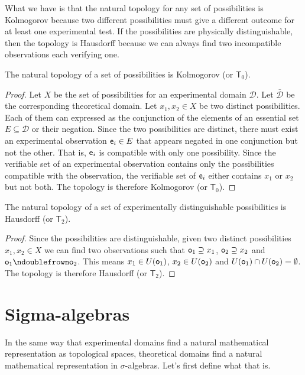 \documentclass[11pt,letterpaper,fleqn]{memoir} %
\begin{document}
What we have is that the natural topology for any set of possibilities is Kolmogorov because two different possibilities must give a different outcome for at least one experimental test. If the possibilities are physically distinguishable, then the topology is Hausdorff because we can always find two incompatible observations each verifying one.

\begin{mathSection}
	\begin{prop}
	The natural topology of a set of possibilities is Kolmogorov (or $\mathsf{T}_0$).
\end{prop}
\begin{proof}
	Let $X$ be the set of possibilities for an experimental domain $\mathcal{D}$. Let $\bar{\mathcal{D}}$ be the corresponding theoretical domain. Let $x_1, x_2 \in X$ be two distinct possibilities. Each of them can expressed as the conjunction of the elements of an essential set $E \subseteq \mathcal{D}$ or their negation. Since the two possibilities are distinct, there must exist an experimental observation $\mathsf{e}_i \in E$ that appears negated in one conjunction but not the other. That is, $\mathsf{e}_i$ is compatible with only one possibility. Since the verifiable set of an experimental observation contains only the possibilities compatible with the observation, the verifiable set of $\mathsf{e}_i$ either contains $x_1$ or $x_2$ but not both. The topology is therefore Kolmogorov (or $\mathsf{T}_0$).
\end{proof}
	\begin{prop}
	The natural topology of a set of experimentally distinguishable possibilities is Hausdorff (or $\mathsf{T}_2$).
\end{prop}
\begin{proof}
	Since the possibilities are distinguishable, given two distinct possibilities $x_1, x_2 \in X$ we can find two observations such that $\mathsf{o}_1 \supseteq x_1$, $\mathsf{o}_2 \supseteq x_2$ and $\obs{o}_1 \ncomp \obs{o}_2$. This means $x_1 \in U(\mathsf{o}_1)$, $x_2 \in U(\mathsf{o}_2)$ and $U(\mathsf{o}_1) \cap U(\mathsf{o}_2) = \emptyset$. The topology is therefore Hausdorff (or $\mathsf{T}_2$).
\end{proof}
\end{mathSection}

\section{Sigma-algebras}

In the same way that experimental domains find a natural mathematical representation as topological spaces, theoretical domains find a natural mathematical representation in $\sigma$-algebras. Let's first define what that is.
\end{document}
